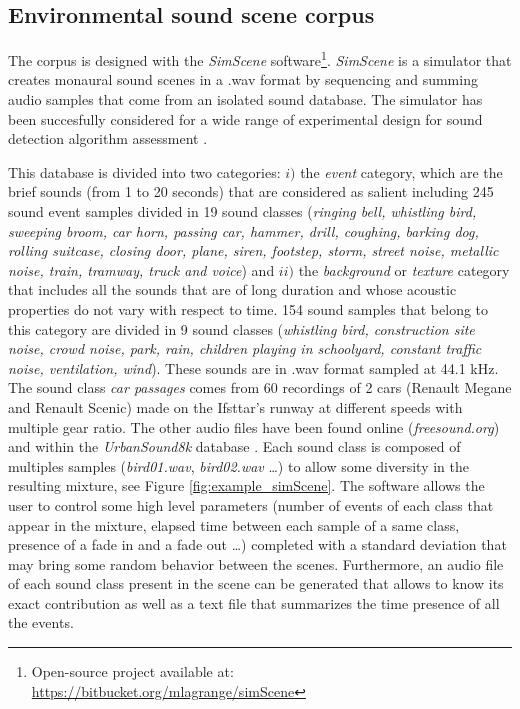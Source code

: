 \documentclass[twocolumn,a4paper,10pt]{article}
\begin{document}
\subsection{Environmental sound scene corpus}

The corpus is designed with the \textit{SimScene} software\footnote{Open-source project available at: \url{https://bitbucket.org/mlagrange/simScene}}. \textit{SimScene} \cite{rossignol_simscene:_2015} is a simulator that creates monaural sound scenes in a .wav format by sequencing and summing audio samples that come from an isolated sound database. The simulator has been succesfully considered for a wide range of experimental design for sound detection algorithm assessment \cite{lafay:hal-01111381} \cite{benetos:hal-01520194} \cite{mesaros:hal-01650601}.

This database is divided into two categories: $i)$ the \textit{event} category, which are the brief sounds (from 1 to 20 seconds) that are considered as salient including 245 sound event samples divided in 19 sound classes (\textit{ringing bell, whistling bird, sweeping broom, car horn, passing car, hammer, drill, coughing, barking dog, rolling suitcase, closing door, plane, siren, footstep, storm, street noise, metallic noise, train, tramway, truck and voice}) and $ii)$ the \textit{background} or \textit{texture} category that includes all the sounds that are of long duration and whose acoustic properties do not vary with respect to time. 154 sound samples that belong to this category are divided in 9 sound classes (\textit{whistling bird, construction site noise, crowd noise, park, rain, children playing in schoolyard, constant traffic noise, ventilation, wind}). These sounds are in .wav format sampled at 44.1 kHz. The sound class \textit{car passages} comes from 60 recordings of 2 cars (Renault Megane and Renault Scenic) made on the Ifsttar's runway at different speeds with multiple gear ratio. The other audio files have been found online (\textit{freesound.org}) and within the \textit{UrbanSound8k} database \cite{salamon_dataset_nodate}. Each sound class is composed of multiples samples (\textit{bird01.wav}, \textit{bird02.wav} \dots) to allow some diversity in the resulting mixture, see Figure \ref{fig:example_simScene}. The software allows the user to control some high level parameters (number of events of each class that appear in the mixture, elapsed time between each sample of a same class, presence of a fade in and a fade out \dots) completed with a standard deviation that may bring some random behavior between the scenes. Furthermore, an audio file of each sound class present in the scene can be generated that allows to know its exact contribution as well as a text file that summarizes the time presence of all the events.\\
\end{document}
